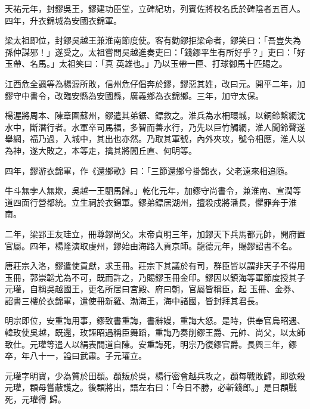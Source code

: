 \begin{pinyinscope}
 天祐元年，封鏐吳王，鏐建功臣堂，立碑紀功，列賓佐將校名氏於碑陰者五百人。四年，升衣錦城為安國衣錦軍。



 梁太祖即位，封鏐吳越王兼淮南節度使。客有勸鏐拒梁命者，鏐笑曰：「吾豈失為孫仲謀邪！」遂受之。太祖嘗問吳越進奏吏曰：「錢鏐平生有所好乎？」吏曰：「好玉帶、名馬。」太祖笑曰：「真
 英雄也。」乃以玉帶一匣、打球御馬十匹賜之。



 江西危全諷等為楊渥所敗，信州危仔倡奔於鏐，鏐惡其姓，改曰元。開平二年，加鏐守中書令，改臨安縣為安國縣，廣義鄉為衣錦鄉。三年，加守太保。



 楊渥將周本、陳章圍蘇州，鏐遣其弟鋸、鏢救之。淮兵為水柵環城，以銅鈴繫網沈水中，斷潛行者。水軍卒司馬福，多智而善水行，乃先以巨竹觸網，淮人聞鈴聲遂舉網，福乃過，入城中，其出也亦然。乃取其軍號，內外夾攻，號令相應，淮人以為神，遂大敗之，本等走，擒其將閭丘直、何明等。



 四年，鏐游衣錦軍，作《還鄉歌》曰：「三節還鄉兮掛錦衣，父老遠來相追隨。



 牛斗無孛人無欺，吳越一王駟馬歸。」乾化元年，加鏐守尚書令，兼淮南、宣潤等道四面行營都統。立生祠於衣錦軍。鏐弟鏢居湖州，擅殺戍將潘長，懼罪奔于淮南。



 二年，梁郢王友珪立，冊尊鏐尚父。末帝貞明三年，加鏐天下兵馬都元帥，開府置官屬。四年，楊隆演取虔州，鏐始由海路入貢京師。龍德元年，賜鏐詔書不名。



 唐莊宗入洛，鏐遣使貢獻，求玉冊。莊宗下其議於有司，群臣皆以謂非天子不得用玉冊，郭崇韜尤為不可，既而許之，乃賜鏐玉冊金印。鏐因以鎮海等軍節度授其子元瓘，自稱吳越國王，更名所居曰宮殿、府曰朝，官屬皆稱臣，起
 玉冊、金券、詔書三樓於衣錦軍，遣使冊新羅、渤海王，海中諸國，皆封拜其君長。



 明宗即位，安重誨用事，鏐致書重誨，書辭嫚，重誨大怒。是時，供奉官烏昭遇、韓玫使吳越，既還，玫誣昭遇稱臣舞蹈，重誨乃奏削鏐王爵、元帥、尚父，以太師致仕。元瓘等遣人以絹表間道自陳。安重誨死，明宗乃復鏐官爵。長興三年，鏐卒，年八十一，謚曰武肅。子元瓘立。



 元瓘字明寶，少為質於田頵。頵叛於吳，楊行密會越兵攻之，頵每戰敗歸，即欲殺元瓘，頵母嘗蔽護之。後頵將出，語左右曰：「今日不勝，必斬錢郎。」是日頵戰死，元瓘得
 歸。




\end{pinyinscope}

